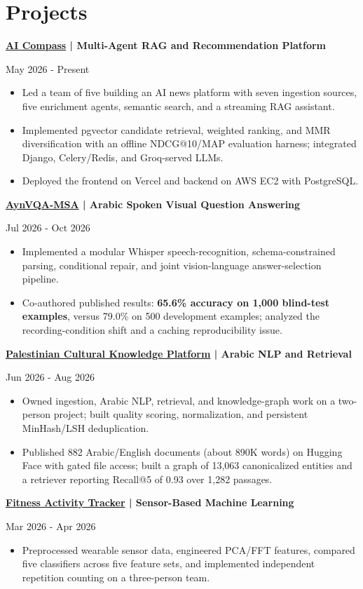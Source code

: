 \documentclass[11pt,letterpaper]{article}
\newcommand{\entry}[2]{\needspace{4\baselineskip}\textbf{#1}\par #2\par}
\newcommand{\gap}{\vspace{5pt}}
\begin{document}
\section{Projects}
\entry{\href{https://mohammed-eid-portfolio.vercel.app/projects/ai-compass}{AI Compass} | Multi-Agent RAG and Recommendation Platform}{May 2026 - Present}
\begin{itemize}
\item Led a team of five building an AI news platform with seven ingestion sources, five enrichment agents, semantic search, and a streaming RAG assistant.
\item Implemented pgvector candidate retrieval, weighted ranking, and MMR diversification with an offline NDCG@10/MAP evaluation harness; integrated Django, Celery/Redis, and Groq-served LLMs.
\item Deployed the frontend on Vercel and backend on AWS EC2 with PostgreSQL.
\end{itemize}
\gap
\entry{\href{https://mohammed-eid-portfolio.vercel.app/projects/aynvqa-msa}{AynVQA-MSA} | Arabic Spoken Visual Question Answering}{Jul 2026 - Oct 2026}
\begin{itemize}
\item Implemented a modular Whisper speech-recognition, schema-constrained parsing, conditional repair, and joint vision-language answer-selection pipeline.
\item Co-authored published results: \textbf{65.6\% accuracy on 1,000 blind-test examples}, versus 79.0\% on 500 development examples; analyzed the recording-condition shift and a caching reproducibility issue.
\end{itemize}
\gap
\entry{\href{https://mohammed-eid-portfolio.vercel.app/projects/palestinian-cultural-knowledge-platform}{Palestinian Cultural Knowledge Platform} | Arabic NLP and Retrieval}{Jun 2026 - Aug 2026}
\begin{itemize}
\item Owned ingestion, Arabic NLP, retrieval, and knowledge-graph work on a two-person project; built quality scoring, normalization, and persistent MinHash/LSH deduplication.
\item Published 882 Arabic/English documents (about 890K words) on Hugging Face with gated file access; built a graph of 13,063 canonicalized entities and a retriever reporting Recall@5 of 0.93 over 1,282 passages.
\end{itemize}
\gap
\entry{\href{https://mohammed-eid-portfolio.vercel.app/projects/fitness-activity-tracker}{Fitness Activity Tracker} | Sensor-Based Machine Learning}{Mar 2026 - Apr 2026}
\begin{itemize}
\item Preprocessed wearable sensor data, engineered PCA/FFT features, compared five classifiers across five feature sets, and implemented independent repetition counting on a three-person team.
\end{itemize}
\end{document}
